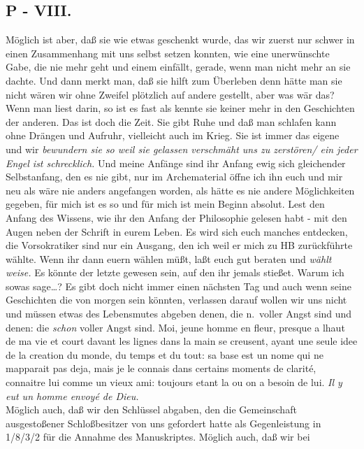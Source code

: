 \documentclass[
]{article}
\author{}
\date{\vspace{-2.5em}}
\begin{document}
\subsection{P - VIII.}\label{p---viii.}

Möglich ist aber, daß sie wie etwas geschenkt wurde, das wir zuerst nur
schwer in einen Zusammenhang mit uns selbst setzen konnten, wie eine
unerwünschte Gabe, die nie mehr geht und einem einfällt, gerade, wenn
man nicht mehr an sie dachte. Und dann merkt man, daß sie hilft zum
Überleben denn hätte man sie nicht wären wir ohne Zweifel plötzlich auf
andere gestellt, aber was wär das? Wenn man liest darin, so ist es fast
als kennte sie keiner mehr in den Geschichten der anderen. Das ist doch
die Zeit. Sie gibt Ruhe und daß man schlafen kann ohne Drängen und
Aufruhr, vielleicht auch im Krieg. Sie ist immer das eigene und wir
\emph{bewundern sie so weil sie gelassen verschmäht uns zu zerstören/
ein jeder Engel ist schrecklich.} Und meine Anfänge sind ihr Anfang ewig
sich gleichender Selbstanfang, den es nie gibt, nur im Archematerial
öffne ich ihn euch und mir neu als wäre nie anders angefangen worden,
als hätte es nie andere Möglichkeiten gegeben, für mich ist es so und
für mich ist mein Beginn absolut. Lest den Anfang des Wissens, wie ihr
den Anfang der Philosophie gelesen habt - mit den Augen neben der
Schrift in eurem Leben. Es wird sich euch manches entdecken, die
Vorsokratiker sind nur ein Ausgang, den ich weil er mich zu HB
zurückführte wählte. Wenn ihr dann euern wählen müßt, laßt euch gut
beraten und \emph{wählt weise.} Es könnte der letzte gewesen sein, auf
den ihr jemals stießet. Warum ich sowas sage\ldots? Es gibt doch nicht
immer einen nächsten Tag und auch wenn seine Geschichten die von morgen
sein könnten, verlassen darauf wollen wir uns nicht und müssen etwas des
Lebensmutes abgeben denen, die n.~voller Angst sind und denen: die
\emph{schon} voller Angst sind. Moi, jeune homme en fleur, presque a
l\textquotesingle haut de ma vie et court d\textquotesingle avant les
lignes dans la main se creusent, ayant une seule idee de la creation du
monde, du temps et du tout: sa base est un nome qui ne
m\textquotesingle apparait pas deja, mais je le connais dans certains
moments de clarité, connaitre lui comme un vieux ami: toujours etant la
ou on a besoin de lui. \emph{Il y eut un homme envoyé de Dieu.}\\
Möglich auch, daß wir den Schlüssel abgaben, den die Gemeinschaft
ausgestoßener Schloßbesitzer von uns gefordert hatte als Gegenleistung
in 1/8/3/2 für die Annahme des Manuskriptes. Möglich auch, daß wir bei
\end{document}
